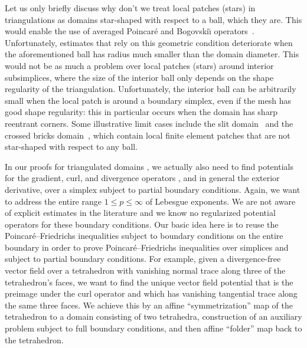\documentclass[10pt,a4paper]{article}
\newcommand\cye[1]{%
\protect\leavevmode
\begingroup
    \color{blue}%
    #1%
\endgroup
}
\begin{document}

\cye{Let us only briefly discuss why don't we treat local \cye{patches} (stars) in triangulations as} domains star-shaped with respect to a ball, which they are. This \cye{would enable} the use of averaged Poincar\'e and Bogovski\u{\i} operators~\cite{costabel2010bogovskiui}. Unfortunately, estimates that rely on this geometric condition deteriorate when the aforementioned ball has radius much smaller than the domain diameter. 
This \cye{would not be} as much a problem over local patches (stars) around interior subsimplices, where the size of the interior ball only depends on the shape regularity of the triangulation. 
\cye{Unfortunately,} the interior ball can be arbitrarily small when the local patch is around a boundary simplex, even if the mesh has good shape regularity: 
this \cye{in particular} occurs when the domain has sharp reentrant corners. Some illustrative limit cases include the slit domain~\cite{veeser2012poincare} and the crossed bricks domain~\cite{licht2019smoothed}, 
which contain local finite element patches \cye{that} are not star-shaped with respect to any ball. 


\cye{In our proofs for triangulated domains}, we \cye{actually also} need to find potentials for the gradient, curl, and divergence operators\cye{, and in general the exterior derivative,} over a simplex subject to partial boundary conditions. 
Again, we want to address the entire range $1 \leq p \leq \infty$ of Lebesgue exponents. 
We are not aware of explicit estimates in the literature and \cye{we know} no regularized potential operators for these boundary conditions. 
\cye{Our basic idea here is to reuse} the Poincar\'e--Friedrichs inequalities subject to boundary conditions \cye{on the entire boundary in order} to prove Poincar\'e--Friedrichs inequalities over simplices and subject to partial boundary conditions. 
For example, given a divergence-free vector field over a tetrahedron with vanishing normal trace along three of the tetrahedron's faces, we want to find the unique vector field potential that is the preimage under the curl operator and which has vanishing tangential trace along the same three faces. We achieve this by \cye{an affine ``symmetrization'' map of the tetrahedron to a domain consisting of two tetrahedra,} construction of an auxiliary problem subject to full boundary conditions, and then affine ``folder'' map back to the tetrahedron.
\end{document}
